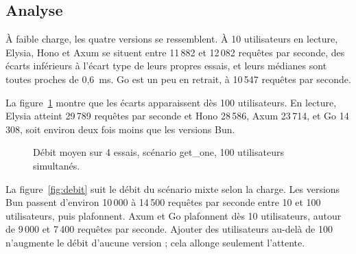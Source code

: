 \documentclass[conference,a4paper]{IEEEtran}
\begin{document}
\subsection{Analyse}
À faible charge, les quatre versions se ressemblent. À 10 utilisateurs
en lecture, Elysia, Hono et Axum se situent entre 11\,882 et
12\,082 requêtes par seconde, des écarts inférieurs à l'écart type de
leurs propres essais, et leurs médianes sont toutes proches de 0,6~ms.
Go est un peu en retrait, à 10\,547 requêtes par seconde.

La figure~\ref{fig:barres} montre que les écarts apparaissent dès
100 utilisateurs. En lecture, Elysia atteint 29\,789 requêtes par
seconde et Hono 28\,586, Axum 23\,714, et Go 14\,308, soit environ deux
fois moins que les versions Bun.

\begin{figure}[htbp]
\centering
{}
\caption{Débit moyen sur 4 essais, scénario get\_one, 100 utilisateurs simultanés.}
\label{fig:barres}
\end{figure}

La figure~\ref{fig:debit} suit le débit du scénario mixte selon la
charge. Les versions Bun passent d'environ 10\,000 à 14\,500 requêtes
par seconde entre 10 et 100 utilisateurs, puis plafonnent. Axum et Go
plafonnent dès 10 utilisateurs, autour de 9\,000 et 7\,400 requêtes par
seconde. Ajouter des utilisateurs au-delà de 100 n'augmente le débit
d'aucune version ; cela allonge seulement l'attente.
\end{document}
